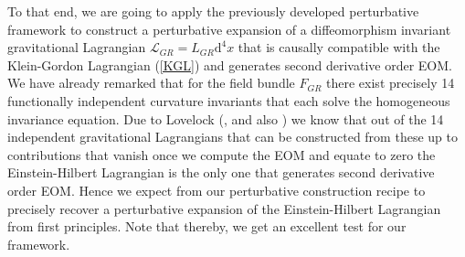 \documentclass[a4paper,12pt, DIV=14, BCOR=5mm, twoside, headsepline, numbers=noenddot]{scrbook}
\begin{document}
To that end, we are going to apply the previously developed perturbative framework to construct a perturbative expansion of a diffeomorphism invariant gravitational Lagrangian $\mathcal{L}_{GR} = L_{GR} \mathrm{d}^4x$ that is causally compatible with the Klein-Gordon Lagrangian (\ref{KGL}) and generates second derivative order EOM. 
We have already remarked that for the field bundle $F_{GR}$ there exist precisely 14 functionally independent curvature invariants that each solve the homogeneous invariance equation. Due to Lovelock (\cite{Lovelock1969}, \cite{doi:10.1063/1.1665613} and also \cite{doi:10.1063/1.1666069}) we know that out of the 14 independent gravitational Lagrangians that can be constructed from these up to contributions that vanish once we compute the EOM and equate to zero the Einstein-Hilbert Lagrangian is the only one that generates second derivative order EOM. 
Hence we expect from our perturbative construction recipe to precisely recover a perturbative expansion of the Einstein-Hilbert Lagrangian from first principles. Note that thereby, we get an excellent test for our framework. 
\end{document}
